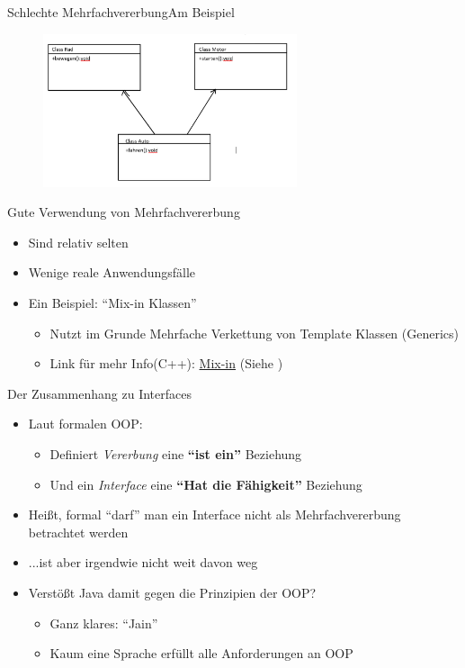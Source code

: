 \begin{frame}{Schlechte Mehrfachvererbung}{Am Beispiel}
    \begin{figure}
        \centering
        \includegraphics[height=4.5cm]{graph/badMI}
    \end{figure}
\end{frame}

\begin{frame}{Gute Verwendung von Mehrfachvererbung}
\begin{itemize}
    \item Sind relativ selten
    \item Wenige reale Anwendungsfälle
    \item Ein Beispiel: "`Mix-in Klassen"'
    \begin{itemize}
        \item Nutzt im Grunde Mehrfache Verkettung von Template Klassen (Generics)
        \item Link für mehr Info(C++): \href{http://www.thinkbottomup.com.au/site/blog/C\%20\%20_Mixins_-_Reuse_through_inheritance_is_good}{Mix-in} (Siehe \cite{mixin})
    \end{itemize}
\end{itemize}
\end{frame}

\begin{frame}{Der Zusammenhang zu Interfaces}
    \begin{itemize}[<+->]
        \item Laut formalen OOP:
        \begin{itemize}
            \item Definiert \textit{Vererbung} eine \textbf{"`ist ein"'} Beziehung
            \item Und ein \textit{Interface} eine \textbf{"`Hat die Fähigkeit"'} Beziehung
        \end{itemize}
        \item Heißt, formal "`darf"' man ein Interface nicht als Mehrfachvererbung betrachtet werden
        \item ...ist aber irgendwie nicht weit davon weg
        \item Verstößt Java damit gegen die Prinzipien der OOP?
        \begin{itemize}[<+-|handout:0>]
            \item Ganz klares: "`Jain"'
            \item Kaum eine Sprache erfüllt alle Anforderungen an OOP
        \end{itemize}
    \end{itemize}
\end{frame}

